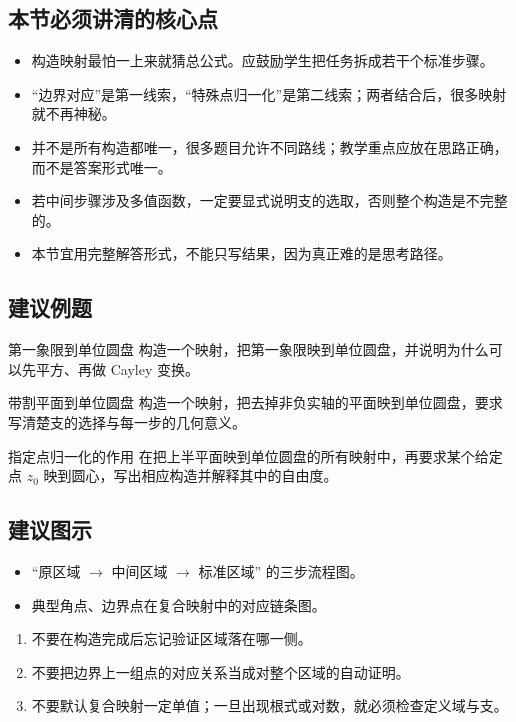 \subsection*{本节必须讲清的核心点}
\begin{itemize}
    \item 构造映射最怕一上来就猜总公式。应鼓励学生把任务拆成若干个标准步骤。
    \item ``边界对应''是第一线索，``特殊点归一化''是第二线索；两者结合后，很多映射就不再神秘。
    \item 并不是所有构造都唯一，很多题目允许不同路线；教学重点应放在思路正确，而不是答案形式唯一。
    \item 若中间步骤涉及多值函数，一定要显式说明支的选取，否则整个构造是不完整的。
    \item 本节宜用完整解答形式，不能只写结果，因为真正难的是思考路径。
\end{itemize}

\subsection*{建议例题}
\begin{lizi}{第一象限到单位圆盘}{}
构造一个映射，把第一象限映到单位圆盘，并说明为什么可以先平方、再做 Cayley 变换。
\end{lizi}

\begin{lizi}{带割平面到单位圆盘}{}
构造一个映射，把去掉非负实轴的平面映到单位圆盘，要求写清楚支的选择与每一步的几何意义。
\end{lizi}

\begin{lizi}{指定点归一化的作用}{}
在把上半平面映到单位圆盘的所有映射中，再要求某个给定点 $z_0$ 映到圆心，写出相应构造并解释其中的自由度。
\end{lizi}

\subsection*{建议图示}
\begin{itemize}
    \item ``原区域 $\to$ 中间区域 $\to$ 标准区域'' 的三步流程图。
    \item 典型角点、边界点在复合映射中的对应链条图。
\end{itemize}

\begin{jinshi}[本节易错点]
\begin{enumerate}
    \item 不要在构造完成后忘记验证区域落在哪一侧。
    \item 不要把边界上一组点的对应关系当成对整个区域的自动证明。
    \item 不要默认复合映射一定单值；一旦出现根式或对数，就必须检查定义域与支。
\end{enumerate}
\end{jinshi}

